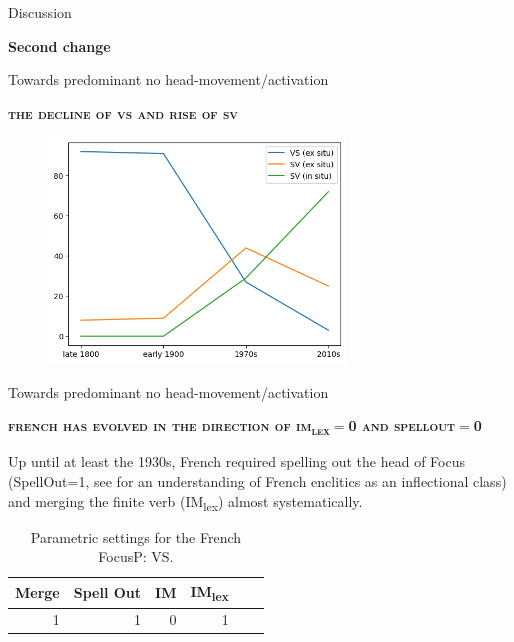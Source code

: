 \documentclass[lesson_slides]{subfiles}
\begin{document}
\begin{frame}[c]{Discussion}
    
\begin{center}
    \textbf{Second change}
\end{center}
  
\end{frame}

\begin{frame}[c]{Towards predominant no head-movement/activation}

    \textbf{\textsc{the decline of vs and rise of sv}}
    \begin{center}
        \includegraphics[width=10cm, height=6cm]{images/exsituinsitu.png}
    \end{center}
  
\end{frame}
\begin{frame}[c]{Towards predominant no head-movement/activation}

    \textbf{\textsc{french has evolved in the direction of im\textsubscript{lex}$=$0 and spellout$=$0}} \pause

    \noindent Up until at least the 1930s, French required spelling out the head of Focus (SpellOut=1, see \citealt{roberts2017} for an understanding of French enclitics as an inflectional class) and merging the finite verb (IM\textsubscript{lex}) almost systematically. \pause

    \begin{table}[H]
        \centering
        \begin{tabular}{|r|r|r|r|r|r|}
        \hline
        Merge & Spell Out & IM  & IM\textsubscript{lex} \\
        \hline
        1 & 1 & 0 & 1 \\
        \hline
        \end{tabular}
        \caption{\label{tab:samp}Parametric settings for the French FocusP: VS.}
    \end{table}
  
\end{frame}
\end{document}
